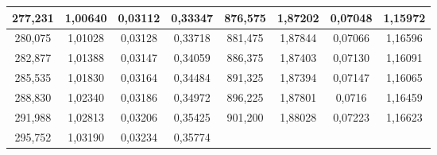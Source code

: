 \documentclass[a4paper,12pt]{article}
\numberwithin{equation}{section}
\begin{document}
\begin{appendices}
\begin{longtable}[c]{|c|c|c|c|c|c|c|c|}
277,231	&	1,00640	&	0,03112	&	0,33347	&	876,575	&	1,87202	&	0,07048	&	1,15972	\\\hline
280,075	&	1,01028	&	0,03128	&	0,33718	&	881,475	&	1,87844	&	0,07066	&	1,16596	\\\hline
282,877	&	1,01388	&	0,03147	&	0,34059	&	886,375	&	1,87403	&	0,07130	&	1,16091	\\\hline
285,535	&	1,01830	&	0,03164	&	0,34484	&	891,325	&	1,87394	&	0,07147	&	1,16065	\\\hline
288,830	&	1,02340	&	0,03186	&	0,34972	&	896,225	&	1,87801	&	0,0716	&	1,16459	\\\hline
291,988	&	1,02813	&	0,03206	&	0,35425	&	901,200	&	1,88028	&	0,07223	&	1,16623	\\\hline
295,752	&	1,03190	&	0,03234	&	0,35774	& \multicolumn{4}{c|}{}\\\cline{1-8}		%

\end{longtable}



\clearpage


\end{appendices}
\end{document}
